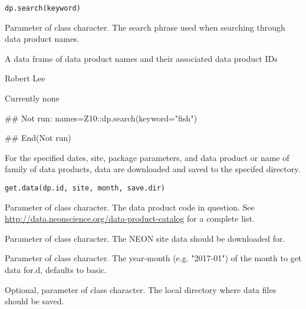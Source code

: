 \documentclass[a4paper]{book}
\begin{document}
%
\begin{Usage}
\begin{verbatim}
dp.search(keyword)
\end{verbatim}
\end{Usage}
%
\begin{Arguments}
\begin{ldescription}
\item[\code{keyword}] Parameter of class character.
The search phrase used when searching through data product names.
\end{ldescription}
\end{Arguments}
%
\begin{Value}
A data frame of data product names and their associated data product IDs
\end{Value}
%
\begin{Author}\relax
Robert Lee \\{}
\end{Author}
%
\begin{SeeAlso}\relax
Currently none
\end{SeeAlso}
%
\begin{Examples}
\begin{ExampleCode}
## Not run: 
names=Z10::dp.search(keyword="fish")

## End(Not run)
\end{ExampleCode}
\end{Examples}
%
\begin{Description}\relax
For the specified dates, site, package parameters,
and data product or name of family of data products,
data are downloaded and saved to the specifed directory.
\end{Description}
%
\begin{Usage}
\begin{verbatim}
get.data(dp.id, site, month, save.dir)
\end{verbatim}
\end{Usage}
%
\begin{Arguments}
\begin{ldescription}
\item[\code{dp.id}] Parameter of class character. The data product code in question.
See \url{http://data.neonscience.org/data-product-catalog} for a complete list.

\item[\code{site}] Parameter of class character.
The NEON site data should be downloaded for.

\item[\code{month}] Parameter of class character. The year-month (e.g. "2017-01")
of the month to get data for.d, defaults to basic.

\item[\code{save.dir}] Optional, parameter of class character.
The local directory where data files should be saved.
\end{ldescription}
\end{Arguments}
\end{document}
